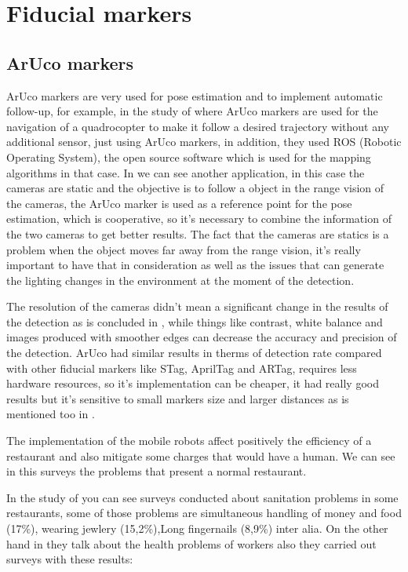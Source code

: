 \section{Fiducial markers}



\subsection{ArUco markers}
ArUco markers are very used for pose estimation and to implement automatic follow-up, for example, in the study of \citep{bacik2017autonomous} where ArUco markers are used for the navigation of a quadrocopter to make it follow a desired trajectory without any additional sensor, just using ArUco markers, in addition, they used ROS (Robotic Operating System), the open source software which is used for the mapping algorithms in that case. In \citep{jimenez2018sistema} we can see another application, in this case the cameras are static and the objective is to follow a object in the range vision of the cameras, the ArUco marker is used as a reference point for the pose estimation, which is cooperative, so it's necessary to combine the information of the two cameras to get better results. The fact that the cameras are statics is a problem when the object moves far away from the range vision, it's really important to have that in consideration as well as the issues that can generate the lighting changes in the environment at the moment of the detection. 

The resolution of the cameras didn't mean a significant change in the results of the detection as is concluded in \citep{kalaitzakis2021fiducial}, while things like contrast, white balance and images produced with smoother edges can decrease the accuracy and precision of the detection. ArUco had similar results in therms of detection rate compared with other fiducial markers like STag, AprilTag and ARTag, requires less hardware resources, so it’s implementation can be cheaper, it had really good results but it’s sensitive to small markers size and larger distances as is mentioned too in \citep{ferrao2018detection}.     

The implementation of the mobile robots affect positively the efficiency of a restaurant and also mitigate some charges that would have a human. We can see in this surveys the problems that present a normal restaurant.


In the study of \citep{florez2011factores} you can see surveys conducted about sanitation problems in some restaurants, some of those problems are simultaneous handling of money and food (17\%), wearing jewlery (15,2\%),Long fingernails (8,9\%) inter alia. On the other hand in \citep{armendariz2012riesgos} they talk about the health problems of workers also they carried out surveys with these results:


